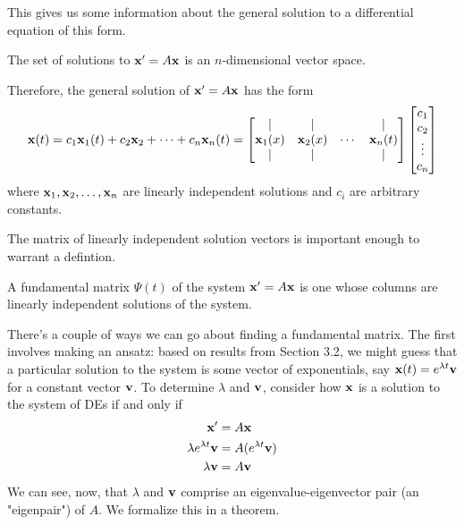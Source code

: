 \documentclass[../m082main.tex]{subfiles}
\begin{document}
This gives us some information about the general solution to a differential equation of this form.

\begin{corollary}
    The set of solutions to $\mathbf{x}' = A \mathbf{x}$ is an $n$-dimensional vector space.
\end{corollary}

Therefore, the general solution of $\mathbf{x}' = A \mathbf{x}$ has the form
\[ \mathbf{x}(t) = c_1 \mathbf{x}_1(t) + c_2 \mathbf{x}_2 + \cdots + c_n \mathbf{x}_n (t) = \begin{bmatrix} | & | &  & | \\ \mathbf{x}_1(x) & \mathbf{x}_2(x) & \cdots & \mathbf{x}_n(t) \\ | & | &  & | \end{bmatrix} \begin{bmatrix} c_1 \\ c_2 \\ \vdots \\ c_n \end{bmatrix} \]
where $\mathbf{x}_1, \mathbf{x}_2, \ldots, \mathbf{x}_n$ are linearly independent solutions and $c_i$ are arbitrary constants.

The matrix of linearly independent solution vectors is important enough to warrant a defintion.

\begin{definition}
    A fundamental matrix $\Psi (t)$ of the system $\mathbf{x}' = A \mathbf{x}$ is one whose columns are linearly independent solutions of the system.
\end{definition}

There's a couple of ways we can go about finding a fundamental matrix.
The first involves making an ansatz: based on results from Section 3.2, we might guess that a particular solution to the system is some vector of exponentials, say $\mathbf{x}(t) = e^{\lambda t} \mathbf{v}$ for a constant vector $\mathbf{v}$.
To determine $\lambda$ and $\mathbf{v}$, consider how $\mathbf{x}$ is a solution to the system of DEs if and only if
\begin{align*}
    \mathbf{x}' &= A \mathbf{x} \\
    \lambda e^{\lambda t} \mathbf{v} &= A (e^{\lambda t} \mathbf{v}) \\
    \lambda \mathbf{v} &= A \mathbf{v}
\end{align*}
We can see, now, that $\lambda$ and $\mathbf{v}$ comprise an eigenvalue-eigenvector pair (an "eigenpair") of $A$.
We formalize this in a theorem.
\end{document}
